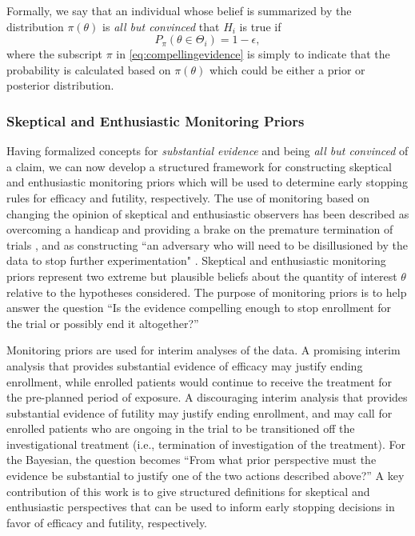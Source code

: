 \documentclass[useAMS,usenatbib,referee]{biom}
\begin{document}
Formally, we say that an individual whose belief is summarized by the distribution $\pi\left(\theta\right)$ is \textit{all but convinced} that $H_i$ is true if 
\begin{equation}\label{eq:compellingevidence}
		P_\pi(\theta\in\Theta_i)= 1-\epsilon,
\end{equation} 
where the subscript $\pi$ in \eqref{eq:compellingevidence} is simply to indicate that the probability is calculated based on $\pi\left(\theta\right)$ which could be either a prior
or posterior distribution.

\subsubsection{Skeptical and Enthusiastic Monitoring Priors}\label{sec:MP}
Having formalized concepts for \textit{substantial evidence} and  being \textit{all but convinced} of a claim, 
we can now develop a structured framework for constructing skeptical and enthusiastic monitoring priors which will be used to 
determine early stopping rules for efficacy and futility, respectively.
%
The use of monitoring based on changing the opinion of skeptical and enthusiastic observers has been described as overcoming a 
handicap \citep{Freedman1989} and providing a brake on the premature termination of trials \citep{Fayers1997}, and as 
constructing ``an adversary who will need to be disillusioned by the data to stop further experimentation" \citep{Spiegelhalter1994}. 
%
Skeptical and enthusiastic monitoring priors represent two extreme but plausible beliefs about the quantity of interest $\theta$ relative to the hypotheses considered.
%
The purpose of monitoring priors is to help answer the question ``Is the evidence compelling enough to stop enrollment for the trial or possibly end it altogether?''

Monitoring priors are used for interim analyses of the data. 
A promising interim analysis that provides substantial evidence of efficacy may justify ending enrollment, while enrolled patients would continue 
to receive the treatment for the pre-planned period of exposure. 
%
A discouraging interim analysis that provides substantial evidence of futility may justify ending enrollment, and may call for enrolled patients 
who are ongoing in the trial to be transitioned off the investigational treatment (i.e., termination of investigation of the treatment). 
%
For the Bayesian, the question becomes ``From what prior perspective must the evidence be substantial to justify one of the two actions described above?''
%
A key contribution of this work is to give structured definitions for skeptical and enthusiastic perspectives that can be used 
to inform early stopping decisions in favor of efficacy and futility, respectively.
\end{document}
